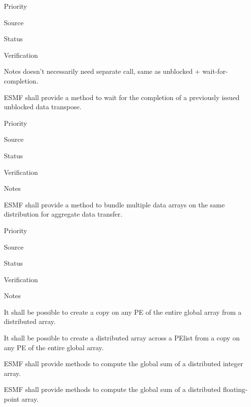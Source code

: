 \begin{reqlist}
\item[Priority]
\item[Source]
\item[Status]
\item[Verification]
\item[Notes] doesn't necessarily need separate call, same as unblocked
  + wait-for-completion.
\end{reqlist}


ESMF shall provide a method to wait for the completion of a previously
issued unblocked data transpose.

\begin{reqlist}
\item[Priority]
\item[Source]
\item[Status]
\item[Verification]
\item[Notes]
\end{reqlist}


ESMF shall provide a method to bundle multiple data arrays on the same
distribution for aggregate data transfer.

\begin{reqlist}
\item[Priority]
\item[Source]
\item[Status]
\item[Verification]
\item[Notes]
\end{reqlist}


It shall be possible to create a copy on any PE of the entire global
array from a distributed array.


It shall be possible to create a distributed array across a PElist
from a copy on any PE of the entire global array.



ESMF shall provide methods to compute the global sum of a distributed
integer array.


ESMF shall provide methods to compute the global sum of a distributed
floating-point array.

